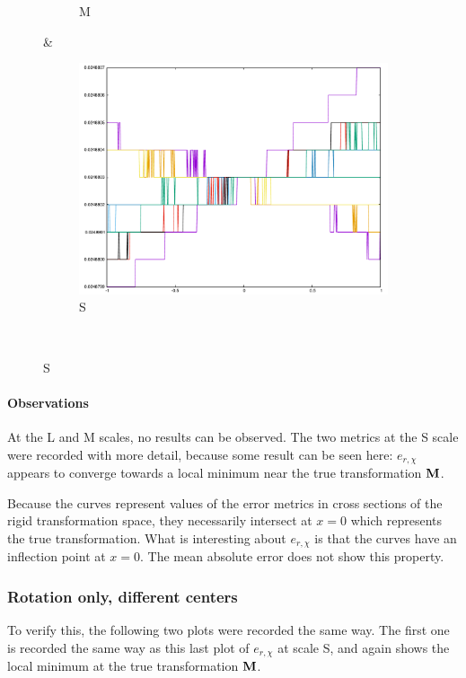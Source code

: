 {\begin{figure}[H]
\begin{subfigure}{.33\textwidth}
	\caption{M}
\end{subfigure}&
\begin{subfigure}{.33\textwidth}
	\includegraphics[width=\linewidth]{fig/ajherr/t3rr/S_mae.pdf}
	\caption{S}
\end{subfigure}\\
\end{figure}


\paragraph{Observations} At the L and M scales, no results can be observed. The two metrics at the S scale were recorded with more detail, because some result can be seen here: $e_{r,\chi}$ appears to converge towards a local minimum near the true transformation $\mathbf{M}$.

Because the curves represent values of the error metrics in cross sections of the rigid transformation space, they necessarily intersect at $x = 0$ which represents the true transformation. What is interesting about $e_{r,\chi}$ is that the curves have an inflection point at $x = 0$. The mean absolute error does not show this property.


\subsubsection{Rotation only, different centers}
To verify this, the following two plots were recorded the same way. The first one is recorded the same way as this last plot of $e_{r,\chi}$ at scale S, and again shows the local minimum at the true transformation $\mathbf{M}$.

}

